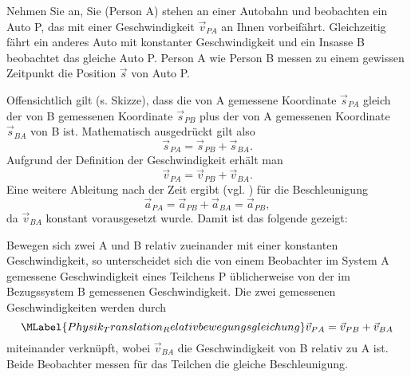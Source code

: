      \begin{MContent}
          Nehmen Sie an, Sie (Person A) stehen an einer Autobahn und beobachten ein Auto P, das mit einer Geschwindigkeit $\vec{v}_{PA}$ an Ihnen vorbeif\"ahrt. Gleichzeitig f\"ahrt ein anderes Auto mit konstanter Geschwindigkeit und ein Insasse B beobachtet das gleiche Auto P. Person A wie Person B messen zu einem gewissen Zeitpunkt die Position $\vec{s}$ von Auto P.
          
          
           Offensichtlich gilt (s. Skizze), dass die von A gemessene Koordinate $\vec{s}_{PA}$ gleich der von B gemessenen Koordinate $\vec{s}_{PB}$ plus der von A gemessenen Koordinate $\vec{s}_{BA}$ von B ist. Mathematisch ausgedr\"uckt gilt also
          \begin{equation*}
         \vec{s}_{PA}=\vec{s}_{PB}+\vec{s}_{BA}.
          \end{equation*}Aufgrund der Definition der Geschwindigkeit  erh\"alt man
          \begin{equation*}
          \vec{v}_{PA}=\vec{v}_{PB}+\vec{v}_{BA}.
          \end{equation*} Eine weitere Ableitung nach der Zeit ergibt (vgl. ) f\"ur die Beschleunigung
     \begin{equation*}
     \vec{a}_{PA}=\vec{a}_{PB}+\vec{a}_{BA}= \vec{a}_{PB},
      \end{equation*}
      da $\vec{v}_{BA}$ konstant vorausgesetzt wurde. Damit ist das folgende gezeigt:
      
      
      \begin{MInfo}
      Bewegen sich zwei  A und B relativ zueinander mit einer konstanten Geschwindigkeit, so unterscheidet sich die von einem Beobachter im System A gemessene Geschwindigkeit eines Teilchens P \"ublicherweise von der im Bezugssystem B gemessenen Geschwindigkeit. Die zwei gemessenen Geschwindigkeiten werden durch 
      \begin{equation}
      \MLabel{Physik_Translation_Relativbewegungsgleichung}
      \vec{v}_{PA}=\vec{v}_{PB}+\vec{v}_{BA}
      \end{equation}miteinander verkn\"upft, wobei $\vec{v}_{BA}$ die Geschwindigkeit von B relativ zu A ist. Beide Beobachter messen f\"ur das Teilchen die gleiche Beschleunigung. 
      \end{MInfo}
      
      \end{MContent}

